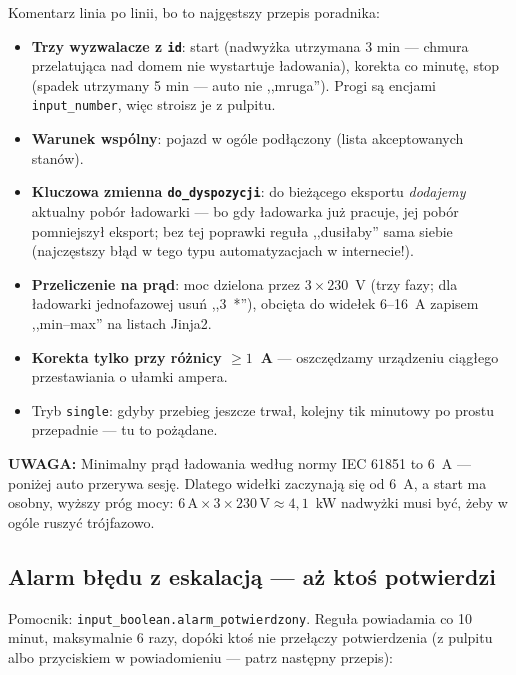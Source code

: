 \documentclass[11pt,a4paper]{article}
\newcommand{\uwaga}[1]{\par\medskip\noindent\textcolor{warnred}{\textbf{UWAGA:}} #1\par\medskip}
\begin{document}
Komentarz linia po linii, bo to najgęstszy przepis poradnika:
\begin{itemize}
\item \textbf{Trzy wyzwalacze z \texttt{id}}: start (nadwyżka utrzymana 3 min --- chmura przelatująca nad domem nie wystartuje ładowania), korekta co minutę, stop (spadek utrzymany 5 min --- auto nie ,,mruga''). Progi są encjami \texttt{input\_number}, więc stroisz je z pulpitu.
\item \textbf{Warunek wspólny}: pojazd w ogóle podłączony (lista akceptowanych stanów).
\item \textbf{Kluczowa zmienna \texttt{do\_dyspozycji}}: do bieżącego eksportu \emph{dodajemy} aktualny pobór ładowarki --- bo gdy ładowarka już pracuje, jej pobór pomniejszył eksport; bez tej poprawki reguła ,,dusiłaby'' sama siebie (najczęstszy błąd w tego typu automatyzacjach w internecie!).
\item \textbf{Przeliczenie na prąd}: moc dzielona przez $3 \times 230$~V (trzy fazy; dla ładowarki jednofazowej usuń ,,3~*''), obcięta do widełek 6--16~A zapisem ,,min--max'' na listach Jinja2.
\item \textbf{Korekta tylko przy różnicy $\geq 1$~A} --- oszczędzamy urządzeniu ciągłego przestawiania o ułamki ampera.
\item Tryb \texttt{single}: gdyby przebieg jeszcze trwał, kolejny tik minutowy po prostu przepadnie --- tu to pożądane.
\end{itemize}

\uwaga{Minimalny prąd ładowania według normy IEC 61851 to 6~A --- poniżej auto przerywa sesję. Dlatego widełki zaczynają się od 6~A, a start ma osobny, wyższy próg mocy: $6\,\mathrm{A} \times 3 \times 230\,\mathrm{V} \approx 4{,}1$~kW nadwyżki musi być, żeby w ogóle ruszyć trójfazowo.}

\subsection{Alarm błędu z eskalacją --- aż ktoś potwierdzi}

Pomocnik: \texttt{input\_boolean.alarm\_potwierdzony}. Reguła powiadamia co 10 minut, maksymalnie 6 razy, dopóki ktoś nie przełączy potwierdzenia (z pulpitu albo przyciskiem w powiadomieniu --- patrz następny przepis):
\end{document}
